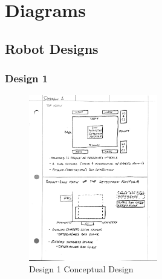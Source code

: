 \documentclass[12pt]{report}
\begin{document}
\chapter{Diagrams}

\section{Robot Designs}
\label{sc:designs}

\subsection{Design 1}
\begin{figure}[H]
    \centering
    \includegraphics[width=0.5\textwidth]{Images/Designs/Design1.pdf}
    \caption{Design 1 Conceptual Design}
    \label{fig:design1}
\end{figure}
\end{document}
